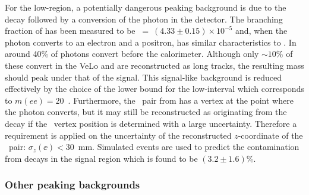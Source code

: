 For the low-\qsq region, a potentially dangerous peaking background is due to the \BdToKstG decay followed by a conversion
of the photon in the detector. The branching fraction of \BdToKstG has been measured to be \mbox{\BF~= $(4.33 \pm 0.15)\times 10^{-5}$} and, 
when the photon converts to an electron and a positron, has similar characteristics to \BdKstee. 
In \lhcb around 40\% of photons convert before the calorimeter. Although only $\sim 10\%$ of these convert
in the VeLo and are reconstructed as long tracks, the resulting \Bd mass should peak under that of the signal. 
This signal-like background is reduced effectively by the choice of the lower bound for the low-\qsq interval which corresponds to 
$m(ee)=20$~\mevcc. Furthermore, the \ee~pair from \BdToKstGee has a vertex at the point where the photon converts, but it may 
still be reconstructed as originating from the \Bd decay if the \ee~vertex position is determined with a large uncertainty. 
Therefore a requirement is applied on the uncertainty of the reconstructed $z$-coordinate of the \ee~pair: $\sigma_z(\ee) < 30$~mm.
Simulated events are used to predict the contamination from \BdToKstGee decays in the signal region which is found to be $(3.2\pm1.6)\%$.



\subsubsection{Other peaking backgrounds}


